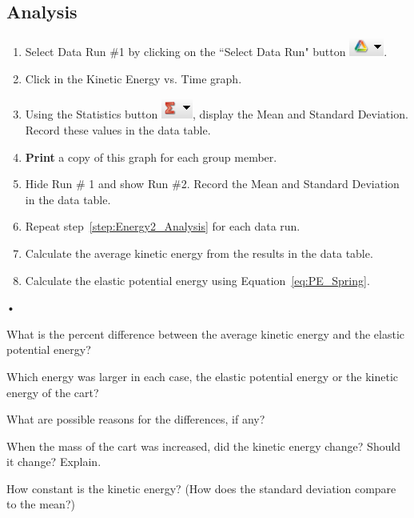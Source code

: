 \documentclass[main.tex]{subfiles}
\begin{document}
\subsection*{Analysis}
\begin{enumerate}
\item
Select Data Run \#1 by clicking on the ``Select Data Run" button \includegraphics{Select_Data_Run}.
\item
Click in the Kinetic Energy vs. Time graph.
\item
Using the Statistics button \includegraphics{Statistics}, display the Mean and Standard Deviation. Record these values in the data table.
\item
\textbf{Print} a copy of this graph for each group member.
\item \label{step:Energy2_Analysis}
Hide Run \# 1 and show Run \#2. Record the Mean and Standard Deviation in the data table.
\item
Repeat step~\ref{step:Energy2_Analysis} for each data run.
\item
Calculate the average kinetic energy from the results in the data table.
\item
Calculate the elastic potential energy using Equation~\eqref{eq:PE_Spring}.
\end{enumerate}•

\begin{question}
What is the percent difference between the average kinetic energy and the elastic potential energy? 
\end{question}
\begin{question}
Which energy was larger in each case, the elastic potential energy or the kinetic energy of the cart?
\end{question}
\begin{question}
What are possible reasons for the differences, if any?
\end{question}
\begin{question}
When the mass of the cart was increased, did the kinetic energy change? Should it change? Explain.
\end{question}
\begin{question}
How constant is the kinetic energy? (How does the standard deviation compare to the mean?) 
\end{question}
\end{document}
